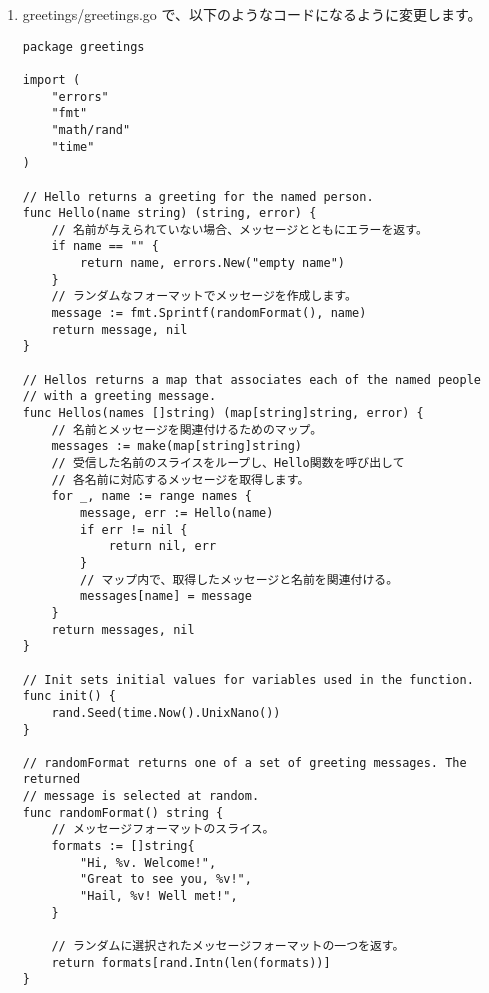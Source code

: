 \begin{enumerate}
\item greetings/greetings.go で、以下のようなコードになるように変更します。

\begin{lstlisting}[numbers=none]
package greetings

import (
    "errors"
    "fmt"
    "math/rand"
    "time"
)

// Hello returns a greeting for the named person.
func Hello(name string) (string, error) {
    // 名前が与えられていない場合、メッセージとともにエラーを返す。
    if name == "" {
        return name, errors.New("empty name")
    }
    // ランダムなフォーマットでメッセージを作成します。
    message := fmt.Sprintf(randomFormat(), name)
    return message, nil
}

// Hellos returns a map that associates each of the named people
// with a greeting message.
func Hellos(names []string) (map[string]string, error) {
    // 名前とメッセージを関連付けるためのマップ。
    messages := make(map[string]string)
    // 受信した名前のスライスをループし、Hello関数を呼び出して
    // 各名前に対応するメッセージを取得します。
    for _, name := range names {
        message, err := Hello(name)
        if err != nil {
            return nil, err
        }
        // マップ内で、取得したメッセージと名前を関連付ける。
        messages[name] = message
    }
    return messages, nil
}

// Init sets initial values for variables used in the function.
func init() {
    rand.Seed(time.Now().UnixNano())
}

// randomFormat returns one of a set of greeting messages. The returned
// message is selected at random.
func randomFormat() string {
    // メッセージフォーマットのスライス。
    formats := []string{
        "Hi, %v. Welcome!",
        "Great to see you, %v!",
        "Hail, %v! Well met!",
    }

    // ランダムに選択されたメッセージフォーマットの一つを返す。
    return formats[rand.Intn(len(formats))]
}
\end{lstlisting}


\end{enumerate}
